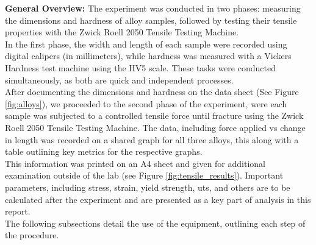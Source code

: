 \documentclass{article}
\begin{document}
\textbf{General Overview:}
The experiment was conducted in two phases: measuring the dimensions and hardness of alloy samples, followed by testing their tensile properties with the Zwick Roell 2050 Tensile Testing Machine. \\[8pt]
In the first phase, the width and length of each sample were recorded using digital calipers (in millimeters), while hardness was measured with a Vickers Hardness test machine using the HV5 scale. These tasks were conducted simultaneously, as both are quick and independent processes.\\[8pt]
After documenting the dimensions and hardness on the data sheet (See Figure \ref{fig:alloys}), we proceeded to the second phase of the experiment, were each sample was subjected to a controlled tensile force until fracture using the Zwick Roell 2050 Tensile Testing Machine. The data, including force applied vs change in length was recorded on a shared graph for all three alloys, this along with a table outlining key metrics for the respective graphs.\\[8pt] 
This information was printed on an A4 sheet and given for additional examination outside of the lab (see Figure \ref{fig:tensile_results}). Important parameters, including stress, strain, yield strength, uts, and others are to be calculated after the experiment and are presented as a key part of analysis in this report.\\[8pt]
The following subsections detail the use of the equipment, outlining each step of the procedure.\\
\newpage{}
\end{document}
